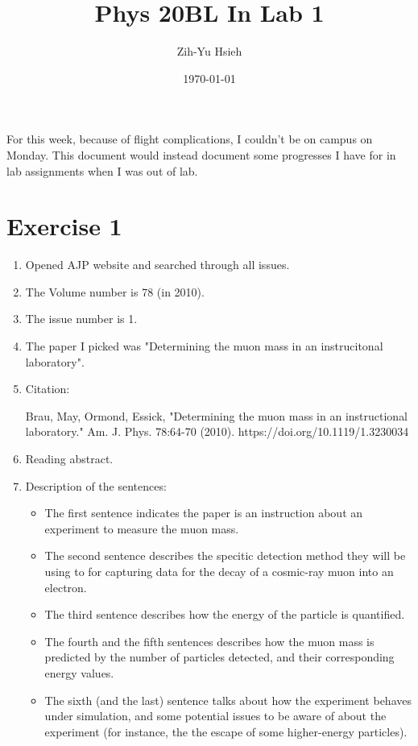 \documentclass{article}
\title{Phys 20BL In Lab 1}
\author{Zih-Yu Hsieh}
\date{\today}
\begin{document}
\maketitle


For this week, because of flight complications, I couldn't be on campus on Monday. This document would instead document some progresses I have for in lab assignments when I was out of lab.

\section*{Exercise 1}

\begin{enumerate}
    \item Opened AJP website and searched through all issues.
    \item The Volume number is 78 (in 2010).
    \item The issue number is 1.
    \item The paper I picked was "Determining the muon mass in an instrucitonal laboratory".
    \item Citation:
    
    \hfil

    Brau, May, Ormond, Essick, "Determining the muon mass in an instructional laboratory." Am. J. Phys. 78:64-70 (2010). https://doi.org/10.1119/1.3230034 

    \hfil

    \item Reading abstract.
    \item Description of the sentences:
    \begin{itemize}
        \item The first sentence indicates the paper is an instruction about an experiment to measure the muon mass.
        \item The second sentence describes the specitic detection method they will be using to for capturing data for the decay of a cosmic-ray muon into an electron.
        \item The third sentence describes how the energy of the particle is quantified.
        \item The fourth and the fifth sentences describes how the muon mass is predicted by the number of particles detected, and their corresponding energy values.
        \item The sixth (and the last) sentence talks about how the experiment behaves under simulation, and some potential issues to be aware of about the experiment (for instance, the the escape of some higher-energy particles).
    \end{itemize}


\end{enumerate}
\end{document}
